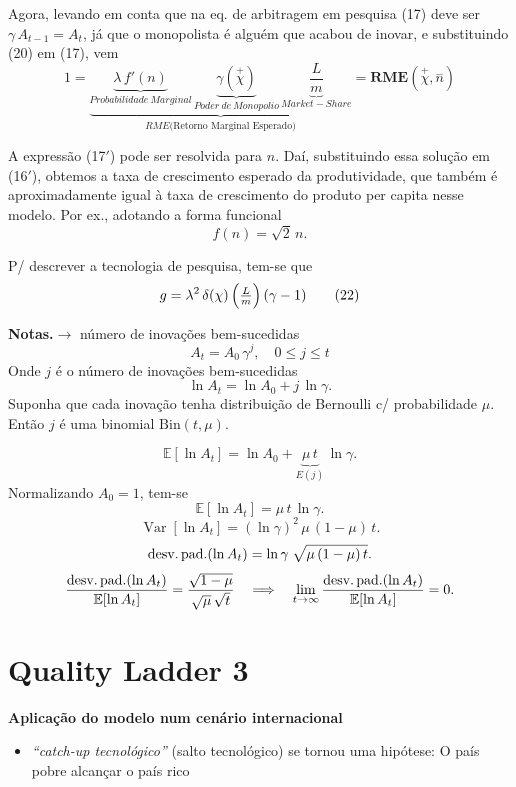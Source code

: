 \documentclass[a4paper,12pt]{article}[abntex2]
\begin{document}
Agora, levando em conta que na eq. de arbitragem em pesquisa (17) deve ser \(\gamma\,A_{t-1} = A_{t}\), já que o monopolista é alguém que acabou de inovar, e substituindo (20) em (17), vem
\[
1 = \underbrace{\underbrace{\lambda\,f'(n)}_{Probabilidade \ Marginal}\,\underbrace{\gamma(\overset{+}{\chi})}_{Poder \  de \  Monopolio}\,\underbrace{\frac{L}{m}}_{Market-Share}}_{RME\text{(Retorno Marginal Esperado)}}=\textbf{RME}(\overset{+}{\chi},\overset{-}{n})
\tag{17$'$}
\]

A expressão (17$'$) pode ser resolvida para \(n\). Daí, substituindo essa solução em (16$'$), obtemos a taxa de crescimento esperado da produtividade, que também é aproximadamente igual à taxa de crescimento do produto per capita nesse modelo. Por ex., adotando a forma funcional
\[
f(n) = \sqrt{2}\,n.
\]

P/ descrever a tecnologia de pesquisa, tem-se que
\[
g = \lambda^{2}\,\delta(\chi)\,\Bigl(\tfrac{L}{m}\Bigr)\,(\gamma-1)
\tag{22}
\]

\noindent\textbf{Notas.}\quad\(\to\) número de inovações bem-sucedidas  
\[
A_{t} = A_{0}\,\gamma^{j},\quad 0 \le j \le t
\]
Onde \(j\) é o número de inovações bem-sucedidas
\[
\ln A_{t} = \ln A_{0} + j\,\ln\gamma.
\]
Suponha que cada inovação tenha distribuição de Bernoulli c/ probabilidade \(\mu\). Então \(j\) é uma binomial \(\mathrm{Bin}(t,\mu)\).

\[
\mathbb{E}[\ln A_{t}] = \ln A_{0} + \underbrace{\mu\,t}_{E(j)}\,\ln\gamma.
\]
Normalizando \(A_{0}=1\), tem-se
\[
\mathbb{E}[\ln A_{t}] = \mu\,t\,\ln\gamma.
\]
\[
\operatorname{Var}[\ln A_{t}]
= (\ln\gamma)^{2}\,\mu\,(1-\mu)\,t.
\]
\[
\text{desv.\,pad.}(\ln A_{t})
= \ln\gamma\;\sqrt{\mu\,(1-\mu)\,t}.
\]
\[
\frac{\text{desv.\,pad.}(\ln A_{t})}{\mathbb{E}[\ln A_{t}]}
= \frac{\sqrt{1-\mu}}{\sqrt{\mu}\,\sqrt{t}}
\quad\Longrightarrow\quad
\lim_{t\to\infty}
\frac{\text{desv.\,pad.}(\ln A_{t})}{\mathbb{E}[\ln A_{t}]}
= 0.
\]

\newpage
\section{\textbf{Quality Ladder 3}}

\textbf{Aplicação do modelo num cenário internacional}

\begin{itemize}
    \item \textit{“catch-up tecnológico”} (salto tecnológico) se tornou uma hipótese:  
          O país pobre alcançar o país rico
\end{itemize}
\end{document}

